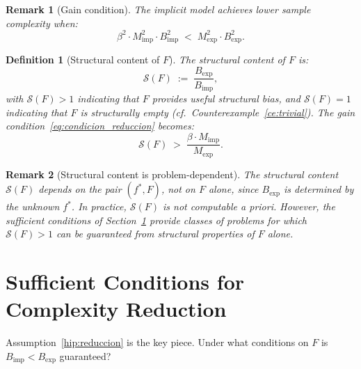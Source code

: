 \documentclass[12pt]{article}
\newtheorem{definition}[theorem]{Definition}
\newtheorem{remark}{Remark}
\begin{document}
\begin{remark}[Gain condition]
\label{rem:gain}
The implicit model achieves lower sample complexity when:
\begin{equation}
  \beta^2 \cdot M_{\mathrm{imp}}^2 \cdot B_{\mathrm{imp}}^2
  \;<\; M_{\mathrm{exp}}^2 \cdot B_{\mathrm{exp}}^2.
  \label{eq:condicion_reduccion}
\end{equation}
\end{remark}

\begin{definition}[Structural content of $F$]
\label{def:structural_content}
The structural content of $F$ is:
\begin{equation}
  \mathcal{S}(F) \;:=\; \frac{B_{\mathrm{exp}}}{B_{\mathrm{imp}}},
\end{equation}
with $\mathcal{S}(F) > 1$ indicating that $F$ provides useful
structural bias, and $\mathcal{S}(F) = 1$ indicating that $F$ is
structurally empty (cf.\ Counterexample~\ref{ce:trivial}).
The gain condition~\eqref{eq:condicion_reduccion} becomes:
\begin{equation}
  \mathcal{S}(F) \;>\;
  \frac{\beta \cdot M_{\mathrm{imp}}}{M_{\mathrm{exp}}}.
  \label{eq:condicion_S}
\end{equation}
\end{definition}

\begin{remark}[Structural content is problem-dependent]
\label{rem:problem_dependent}
The structural content $\mathcal{S}(F)$ depends on the pair
$(f^*, F)$, not on $F$ alone, since $B_{\mathrm{exp}}$ is determined
by the unknown $f^*$.
In practice, $\mathcal{S}(F)$ is not computable a priori.
However, the sufficient conditions of
Section~\ref{sec:sufficient} provide classes of problems for which
$\mathcal{S}(F) > 1$ can be guaranteed from structural properties
of $F$ alone.
\end{remark}

\section{Sufficient Conditions for Complexity Reduction}
\label{sec:sufficient}

Assumption~\ref{hip:reduccion} is the key piece.
Under what conditions on $F$ is
$B_{\mathrm{imp}} < B_{\mathrm{exp}}$ guaranteed?
\end{document}
